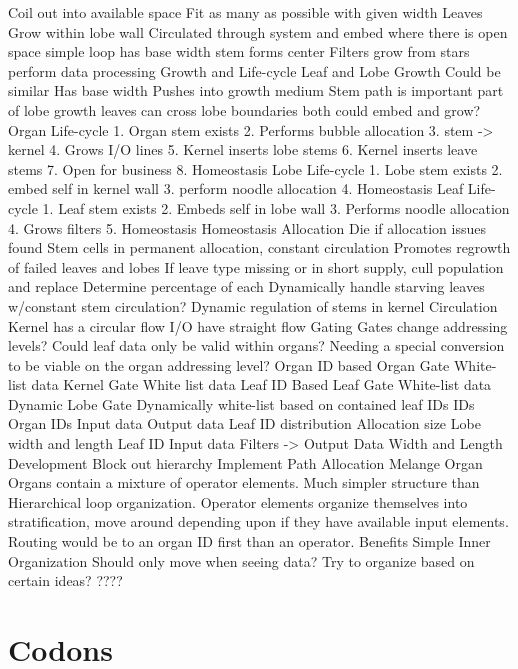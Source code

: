 \documentclass[article,12pt,oneside]{memoir}
\begin{document}
Coil out into available space
Fit as many as possible with given width
Leaves
Grow within lobe wall
Circulated through system and embed where there is open space
simple loop
has base width
stem forms center
Filters grow from stars
perform data processing
Growth and Life-cycle
Leaf and Lobe Growth
Could be similar
Has base width
Pushes into growth medium
Stem path is important part of lobe growth
leaves can cross lobe boundaries
both could embed and grow?
Organ Life-cycle
1. Organ stem exists
2. Performs bubble allocation
3. stem -> kernel
4. Grows I/O lines
5. Kernel inserts lobe stems
6. Kernel inserts leave stems
7. Open for business
8. Homeostasis
Lobe Life-cycle
1. Lobe stem exists
2. embed self in kernel wall
3. perform noodle allocation
4. Homeostasis
Leaf Life-cycle
1. Leaf stem exists
2. Embeds self in lobe wall
3. Performs noodle allocation
4. Grows filters
5. Homeostasis
Homeostasis
Allocation
Die if allocation issues found
Stem cells in permanent allocation, constant circulation
Promotes regrowth of failed leaves and lobes
If leave type missing or in short supply, cull population and replace
Determine percentage of each
Dynamically handle %
starving leaves w/constant stem circulation?
Dynamic regulation of stems in kernel
Circulation
Kernel has a circular flow
I/O have straight flow
Gating
Gates change addressing levels? Could leaf data only be valid within organs? Needing a special conversion to be viable on the organ addressing level?
Organ ID based
Organ Gate
White-list data
Kernel Gate
White list data
Leaf ID Based
Leaf Gate
White-list data
Dynamic
Lobe Gate
Dynamically white-list based on contained leaf IDs
IDs
Organ IDs
Input data
Output data
Leaf ID distribution
Allocation size
Lobe width and length
Leaf ID
Input data
Filters -> Output Data
Width and Length
Development
Block out hierarchy
Implement Path Allocation
Melange Organ
Organs contain a mixture of operator elements. Much simpler structure than Hierarchical loop organization. Operator elements organize themselves into stratification, move around depending upon if they have available input elements.
Routing would be to an organ ID first than an operator.
Benefits
Simple
Inner Organization
Should only move when seeing data? Try to organize based on certain ideas?
????



\section{Codons}\label{codons}
\end{document}

